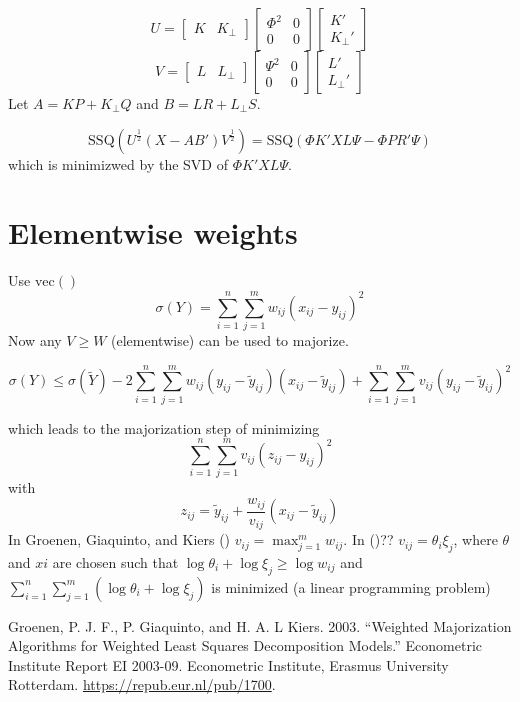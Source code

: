 \documentclass[
  12pt,
  letterpaper,
  DIV=11,
  numbers=noendperiod]{scrartcl}
\newlength{\cslhangindent}
\newenvironment{CSLReferences}[2] %
 {\begin{list}{}{%
  \setlength{\itemindent}{0pt}
  \setlength{\leftmargin}{0pt}
  \setlength{\parsep}{0pt}
  \ifodd #1
   \setlength{\leftmargin}{\cslhangindent}
   \setlength{\itemindent}{-1\cslhangindent}
  \fi
  \setlength{\itemsep}{#2\baselineskip}}}
 {\end{list}}
\begin{document}
\[
U=\begin{bmatrix}K&K_\perp\end{bmatrix}
\begin{bmatrix}\Phi^2&0\\0&0\end{bmatrix}
\begin{bmatrix}K'\\K_\perp'\end{bmatrix}
\] \[
V=\begin{bmatrix}L&L_\perp\end{bmatrix}
\begin{bmatrix}\Psi^2&0\\0&0\end{bmatrix}
\begin{bmatrix}L'\\L_\perp'\end{bmatrix}
\] Let \(A=KP+K_\perp Q\) and \(B=LR+L_\perp S\).

\[
\text{SSQ}(U^\frac12(X-AB')V^\frac12)=
\text{SSQ}(\Phi K'XL\Psi-\Phi PR'\Psi)
\] which is minimizwed by the SVD of \(\Phi K'XL\Psi\).

\section{Elementwise weights}\label{elementwise-weights}

Use \(\text{vec}()\) \[
\sigma(Y)=\sum_{i=1}^n\sum_{j=1}^m w_{ij}(x_{ij}-y_{ij})^2
\] Now any \(V\geq W\) (elementwise) can be used to majorize.

\[
\sigma(Y)\leq\sigma(\tilde Y)-2\sum_{i=1}^n\sum_{j=1}^m w_{ij}(y_{ij}-\tilde y_{ij})(x_{ij}-\tilde y_{ij})+\sum_{i=1}^n\sum_{j=1}^m v_{ij}(y_{ij}-\tilde y_{ij})^2
\]

which leads to the majorization step of minimizing \[
\sum_{i=1}^n\sum_{j=1}^mv_{ij}(z_{ij}-y_{ij})^2
\] with \[
z_{ij}=\tilde y_{ij}+\frac{w_{ij}}{v_{ij}}(x_{ij}-\tilde y_{ij})
\] In Groenen, Giaquinto, and Kiers
()
\(v_{ij}=\max_{j=1}^m w_{ij}\). In
()??
\(v_{ij}=\theta_i\xi_j\), where \(\theta\) and \(xi\) are chosen such
that \(\log\theta_i+\log\xi_j\geq\log w_{ij}\) and
\(\sum_{i=1}^n\sum_{j=1}^m(\log\theta_i+\log\xi_j)\) is minimized (a
linear programming problem)

\label{refs}
\begin{CSLReferences}{1}{0}
Groenen, P. J. F., P. Giaquinto, and H. A. L Kiers. 2003. {``{Weighted
Majorization Algorithms for Weighted Least Squares Decomposition
Models}.''} Econometric Institute Report EI 2003-09. Econometric
Institute, Erasmus University Rotterdam.
\url{https://repub.eur.nl/pub/1700}.

\end{CSLReferences}
\end{document}
